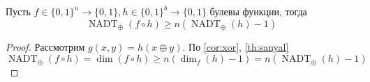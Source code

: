 \documentclass{article}
\begin{document}
\begin{corollary}
    Пусть $f \in \{0, 1\}^n \to \{0, 1\}, h \in \{0, 1\}^b \to \{0, 1\}$ булевы функции, тогда $$\operatorname{NADT}_{\oplus}(f \circ h) \geq n(\operatorname{NADT}_{\oplus}(h) - 1)$$
    \begin{proof}
        Рассмотрим $g(x, y) = h(x \oplus y)$. По \autoref{cor:xor}, \autoref{th:sanyal} $\operatorname{NADT}_{\oplus}(f \circ h) = \dim(f \circ h) \geq n(\dim_f(h) - 1) = n(\operatorname{NADT}_{\oplus}(h) - 1)$
    \end{proof}
\end{corollary}
\end{document}

